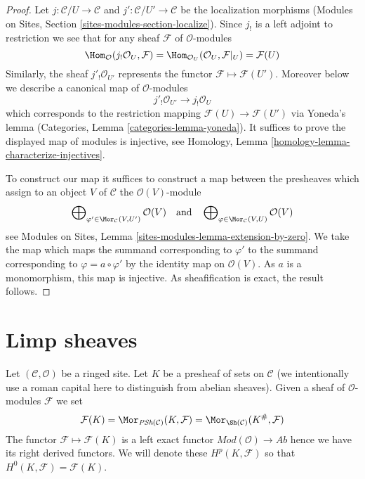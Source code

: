 \begin{proof}
Let $j : \mathcal{C}/U \to \mathcal{C}$ and
$j' : \mathcal{C}/U' \to \mathcal{C}$ be the localization morphisms
(Modules on Sites, Section \ref{sites-modules-section-localize}).
Since $j_!$ is a left adjoint to restriction we see that
for any sheaf $\mathcal{F}$ of $\mathcal{O}$-modules
$$
\Hom_\mathcal{O}(j_!\mathcal{O}_U, \mathcal{F})
=
\Hom_{\mathcal{O}_U}(\mathcal{O}_U, \mathcal{F}|_U)
=
\mathcal{F}(U)
$$
Similarly, the sheaf $j'_!\mathcal{O}_{U'}$ represents the
functor $\mathcal{F} \mapsto \mathcal{F}(U')$.
Moreover below we describe a canonical map of $\mathcal{O}$-modules
$$
j'_!\mathcal{O}_{U'} \longrightarrow j_!\mathcal{O}_U
$$
which corresponds to the restriction mapping
$\mathcal{F}(U) \to \mathcal{F}(U')$ via Yoneda's lemma
(Categories, Lemma \ref{categories-lemma-yoneda}).
It suffices to prove the displayed map of modules is injective, see
Homology, Lemma \ref{homology-lemma-characterize-injectives}.

\medskip\noindent
To construct our map it suffices to construct a map between the
presheaves which assign to an object $V$ of $\mathcal{C}$ the
$\mathcal{O}(V)$-module
$$
\bigoplus\nolimits_{\varphi' \in \Mor_\mathcal{C}(V, U')} \mathcal{O}(V)
\quad\text{and}\quad
\bigoplus\nolimits_{\varphi \in \Mor_\mathcal{C}(V, U)} \mathcal{O}(V)
$$
see Modules on Sites, Lemma \ref{sites-modules-lemma-extension-by-zero}.
We take the map which maps the summand corresponding to $\varphi'$
to the summand corresponding to $\varphi = a \circ \varphi'$
by the identity map on $\mathcal{O}(V)$. As $a$ is a monomorphism,
this map is injective. As sheafification is exact, the result
follows.
\end{proof}






\section{Limp sheaves}
\label{section-limp}

\noindent
Let $(\mathcal{C}, \mathcal{O})$ be a ringed site.
Let $K$ be a presheaf of sets on $\mathcal{C}$ (we intentionally use a
roman capital here to distinguish from abelian sheaves).
Given a sheaf of $\mathcal{O}$-modules $\mathcal{F}$ we set
$$
\mathcal{F}(K) =
\Mor_{\textit{PSh}(\mathcal{C})}(K, \mathcal{F}) =
\Mor_{\Sh(\mathcal{C})}(K^\#, \mathcal{F})
$$
The functor $\mathcal{F} \mapsto \mathcal{F}(K)$ is a left exact functor
$\textit{Mod}(\mathcal{O}) \to \textit{Ab}$ hence we have its
right derived functors. We will denote these $H^p(K, \mathcal{F})$
so that $H^0(K, \mathcal{F}) = \mathcal{F}(K)$.

